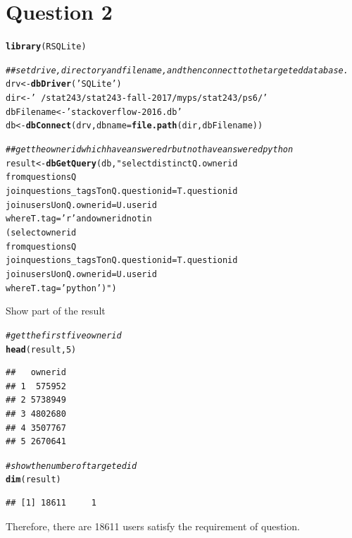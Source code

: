 \documentclass{article}\usepackage[]{graphicx}\usepackage[]{color}
\makeatletter
\newcommand{\hlnum}[1]{\textcolor[rgb]{0.686,0.059,0.569}{#1}}%
\newcommand{\hlstr}[1]{\textcolor[rgb]{0.192,0.494,0.8}{#1}}%
\newcommand{\hlcom}[1]{\textcolor[rgb]{0.678,0.584,0.686}{\textit{#1}}}%
\newcommand{\hlstd}[1]{\textcolor[rgb]{0.345,0.345,0.345}{#1}}%
\newcommand{\hlkwb}[1]{\textcolor[rgb]{0.69,0.353,0.396}{#1}}%
\newcommand{\hlkwc}[1]{\textcolor[rgb]{0.333,0.667,0.333}{#1}}%
\newcommand{\hlkwd}[1]{\textcolor[rgb]{0.737,0.353,0.396}{\textbf{#1}}}%
\newenvironment{kframe}{%
 \def\at@end@of@kframe{}%
 \ifinner\ifhmode%
  \def\at@end@of@kframe{\end{minipage}}%
  \begin{minipage}{\columnwidth}%
 \fi\fi%
 \def\FrameCommand##1{\hskip\@totalleftmargin \hskip-\fboxsep
 \colorbox{shadecolor}{##1}\hskip-\fboxsep
     \hskip-\linewidth \hskip-\@totalleftmargin \hskip\columnwidth}%
 \MakeFramed {\advance\hsize-\width
   \@totalleftmargin\z@ \linewidth\hsize
   \@setminipage}}%
 {\par\unskip\endMakeFramed%
 \at@end@of@kframe}
\newenvironment{knitrout}{}{} %
\makeatother
\begin{document}
\section{Question 2}
\begin{knitrout}
\color{fgcolor}\begin{kframe}
\begin{alltt}
\hlkwd{library}\hlstd{(RSQLite)}

\hlcom{##set drive, directory and filename, and then connect to the targeted database.}
\hlstd{drv}\hlkwb{<-}\hlkwd{dbDriver}\hlstd{(}\hlstr{'SQLite'}\hlstd{)}
\hlstd{dir}\hlkwb{<-}\hlstr{'~/stat243/stat243-fall-2017/myps/stat243/ps6/'}
\hlstd{dbFilename} \hlkwb{<-} \hlstr{'stackoverflow-2016.db'}
\hlstd{db}\hlkwb{<-}\hlkwd{dbConnect}\hlstd{(drv,}\hlkwc{dbname}\hlstd{=}\hlkwd{file.path}\hlstd{(dir,dbFilename))}

\hlcom{##get the ownerid which have answered r but not have answered python}
\hlstd{result}\hlkwb{<-}\hlkwd{dbGetQuery}\hlstd{(db,} \hlstr{"select distinct Q.ownerid 
           from questions Q 
           join questions_tags T on Q.questionid = T.questionid 
           join users U on Q.ownerid = U.userid 
           where T.tag = 'r' and ownerid not in 
           (select ownerid 
           from questions Q
           join questions_tags T on Q.questionid = T.questionid 
           join users U on Q.ownerid = U.userid 
           where T.tag = 'python' ) "}\hlstd{)}
\end{alltt}
\end{kframe}
\end{knitrout}

Show part of the result
\begin{knitrout}
\color{fgcolor}\begin{kframe}
\begin{alltt}
\hlcom{#get the first five ownerid}
\hlkwd{head}\hlstd{(result,}\hlnum{5}\hlstd{)}
\end{alltt}
\begin{verbatim}
##   ownerid
## 1  575952
## 2 5738949
## 3 4802680
## 4 3507767
## 5 2670641
\end{verbatim}
\begin{alltt}
\hlcom{#show the number of targeted id}
\hlkwd{dim}\hlstd{(result)}
\end{alltt}
\begin{verbatim}
## [1] 18611     1
\end{verbatim}
\end{kframe}
\end{knitrout}
Therefore, there are 18611 users satisfy the requirement of question.
\end{document}
